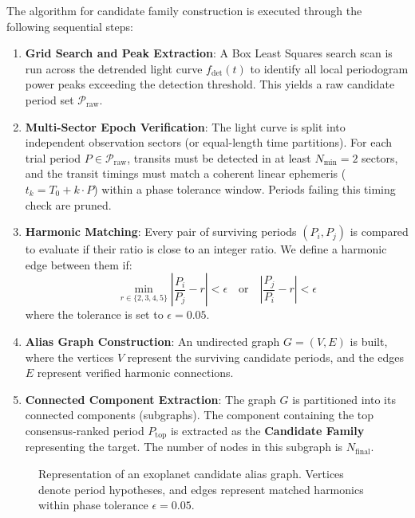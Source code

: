 The algorithm for candidate family construction is executed through the following sequential steps:
\begin{enumerate}
\item \textbf{Grid Search and Peak Extraction}: A Box Least Squares \citep[BLS;][]{Kovacs2002} search scan is run across the detrended light curve $f_{\text{det}}(t)$ to identify all local periodogram power peaks exceeding the detection threshold. This yields a raw candidate period set $\mathcal{P}_{\text{raw}}$.
\item \textbf{Multi-Sector Epoch Verification}: The light curve is split into independent observation sectors (or equal-length time partitions). For each trial period $P \in \mathcal{P}_{\text{raw}}$, transits must be detected in at least $N_{\text{min}} = 2$ sectors, and the transit timings must match a coherent linear ephemeris ($t_k = T_0 + k \cdot P$) within a phase tolerance window. Periods failing this timing check are pruned.
\item \textbf{Harmonic Matching}: Every pair of surviving periods $(P_i, P_j)$ is compared to evaluate if their ratio is close to an integer ratio. We define a harmonic edge between them if:
    \begin{equation}
    \min_{r \in \{2, 3, 4, 5\}} \left| \frac{P_i}{P_j} - r \right| < \epsilon \quad \text{or} \quad \left| \frac{P_j}{P_i} - r \right| < \epsilon
    \label{eq:harmonic_edge}
    \end{equation}
    where the tolerance is set to $\epsilon = 0.05$.
\item \textbf{Alias Graph Construction}: An undirected graph $G = (V, E)$ is built, where the vertices $V$ represent the surviving candidate periods, and the edges $E$ represent verified harmonic connections.
\item \textbf{Connected Component Extraction}: The graph $G$ is partitioned into its connected components (subgraphs). The component containing the top consensus-ranked period $P_{\text{top}}$ is extracted as the \textbf{Candidate Family} representing the target. The number of nodes in this subgraph is $N_{\text{final}}$.
\end{enumerate}

\begin{figure}[htbp]
\centering
{}
\caption{Representation of an exoplanet candidate alias graph. Vertices denote period hypotheses, and edges represent matched harmonics within phase tolerance $\epsilon = 0.05$.}
\label{fig:alias_graph}
\end{figure}

